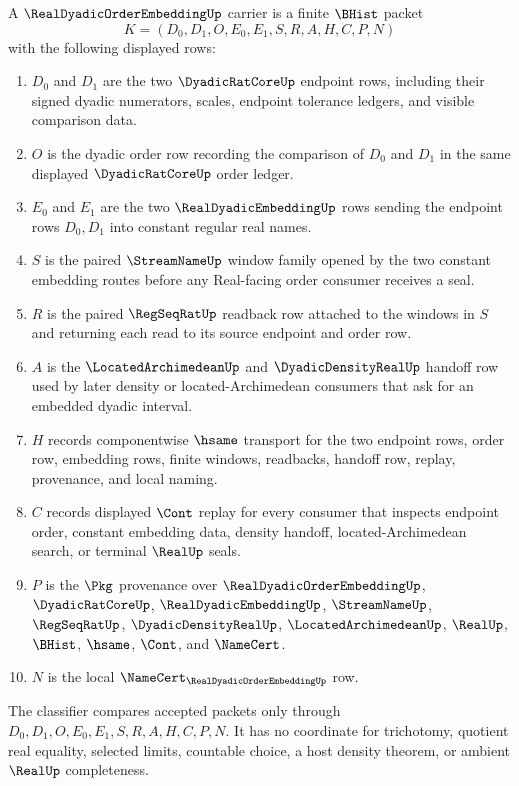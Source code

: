 \begin{definition}
\label{def:real-dyadic-order-embedding-carrier}
A $\RealDyadicOrderEmbeddingUp$ carrier is a finite $\BHist$ packet
$$
K=(D_0,D_1,O,E_0,E_1,S,R,A,H,C,P,N)
$$
with the following displayed rows:
\begin{enumerate}
\item $D_0$ and $D_1$ are the two $\DyadicRatCoreUp$ endpoint rows, including their signed dyadic numerators, scales, endpoint tolerance ledgers, and visible comparison data.
\item $O$ is the dyadic order row recording the comparison of $D_0$ and $D_1$ in the same displayed $\DyadicRatCoreUp$ order ledger.
\item $E_0$ and $E_1$ are the two $\RealDyadicEmbeddingUp$ rows sending the endpoint rows $D_0,D_1$ into constant regular real names.
\item $S$ is the paired $\StreamNameUp$ window family opened by the two constant embedding routes before any Real-facing order consumer receives a seal.
\item $R$ is the paired $\RegSeqRatUp$ readback row attached to the windows in $S$ and returning each read to its source endpoint and order row.
\item $A$ is the $\LocatedArchimedeanUp$ and $\DyadicDensityRealUp$ handoff row used by later density or located-Archimedean consumers that ask for an embedded dyadic interval.
\item $H$ records componentwise $\hsame$ transport for the two endpoint rows, order row, embedding rows, finite windows, readbacks, handoff row, replay, provenance, and local naming.
\item $C$ records displayed $\Cont$ replay for every consumer that inspects endpoint order, constant embedding data, density handoff, located-Archimedean search, or terminal $\RealUp$ seals.
\item $P$ is the $\Pkg$ provenance over $\RealDyadicOrderEmbeddingUp$, $\DyadicRatCoreUp$, $\RealDyadicEmbeddingUp$, $\StreamNameUp$, $\RegSeqRatUp$, $\DyadicDensityRealUp$, $\LocatedArchimedeanUp$, $\RealUp$, $\BHist$, $\hsame$, $\Cont$, and $\NameCert$.
\item $N$ is the local $\NameCert_{\RealDyadicOrderEmbeddingUp}$ row.
\end{enumerate}
The classifier compares accepted packets only through $D_0,D_1,O,E_0,E_1,S,R,A,H,C,P,N$. It has no coordinate for trichotomy, quotient real equality, selected limits, countable choice, a host density theorem, or ambient $\RealUp$ completeness.
\end{definition}

